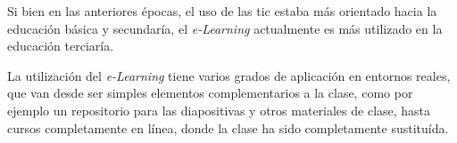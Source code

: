 Si bien en las anteriores épocas, el uso de las \Gls{tic} estaba más orientado
hacia la educación básica y secundaría, el \emph{e-Learning} actualmente es más
utilizado en la educación terciaría\cite{punie:ict}.

La utilización del \emph{e-Learning} tiene varios grados de aplicación en
entornos reales\cite{punie:ict}, que van desde ser simples elementos
complementarios a la clase, como por ejemplo un repositorio para las
diapositivas y otros materiales de clase, hasta cursos completamente en línea,
donde la clase ha sido completamente sustituída.


